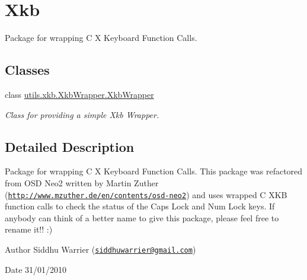 \hypertarget{group__xkb}{
\section{Xkb}
\label{group__xkb}
}


Package for wrapping C X Keyboard Function Calls.  
\subsection*{Classes}
\begin{DoxyCompactItemize}
\item 
class \hyperlink{classutils_1_1xkb_1_1XkbWrapper_1_1XkbWrapper}{utils.xkb.XkbWrapper.XkbWrapper}
\begin{DoxyCompactList}\small\item\em Class for providing a simple Xkb Wrapper. \item\end{DoxyCompactList}\end{DoxyCompactItemize}


\subsection{Detailed Description}
Package for wrapping C X Keyboard Function Calls. This package was refactored from OSD Neo2 written by Martin Zuther (\href{http://www.mzuther.de/en/contents/osd-neo2}{\tt http://www.mzuther.de/en/contents/osd-\/neo2}) and uses wrapped C XKB function calls to check the status of the Caps Lock and Num Lock keys. If anybody can think of a better name to give this package, please feel free to rename it!! :)

\begin{DoxyAuthor}{Author}
Siddhu Warrier (\href{mailto:siddhuwarrier@gmail.com}{\tt siddhuwarrier@gmail.com}) 
\end{DoxyAuthor}
\begin{DoxyDate}{Date}
31/01/2010 
\end{DoxyDate}
